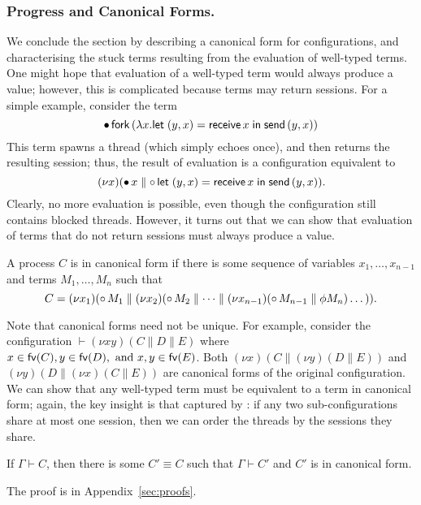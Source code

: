 \documentclass[oribibl,orivec,envcountsame]{llncs}
\begin{document}
\subsubsection{Progress and Canonical Forms.}

We conclude the section by describing a canonical form for configurations, and characterising the
stuck terms resulting from the evaluation of well-typed terms.  One might hope that evaluation of a
well-typed term would always produce a value; however, this is complicated because terms may return
sessions.  For a simple example, consider the term
%
\[
  {\mathord{\bullet}}\,\mathsf{fork} \, (\lambda x. \mathsf{let}\;(y,x) = \mathsf{receive} \, x\;\mathsf{in}\;\mathsf{send} \, (y,x))
\]
%
This term spawns a thread (which simply echoes once), and then returns the resulting session; thus,
the result of evaluation is a configuration equivalent to
\[
  (\nu x)({\mathord{\bullet}}\,x \parallel {\mathord{\circ}}\,\mathsf{let}\;(y,x) = \mathsf{receive} \, x\;\mathsf{in}\;\mathsf{send} \, (y,x)).
\]
Clearly, no more evaluation is possible, even though the configuration still contains blocked
threads.
%
However, it turns out that we can show that evaluation of terms that do not return sessions must
always produce a value.

\begin{definition}
A process $C$ is in canonical form if there is some sequence of variables $x_1,\dots,x_{n-1}$ and
terms $M_1,\dots,M_n$ such that
\[
  C = (\nu x_1)({\mathord{\circ}}\,M_1 \parallel (\nu x_2)({\mathord{\circ}}\,M_2 \parallel \dots \parallel (\nu x_{n-1})({\mathord{\circ}}\,M_{n-1} \parallel \phi M_n)\dots)).
\]
\end{definition}

Note that canonical forms need not be unique.  For example, consider the configuration $\vdash (\nu
xy)(C \parallel D \parallel E)$ where $x \in \mathsf{fv}(C), y \in \mathsf{fv}(D), \text{ and } x,y \in \mathsf{fv}(E)$.
Both $(\nu x)(C \parallel (\nu y)(D \parallel E))$ and $(\nu y)(D \parallel (\nu x)(C \parallel E))$
are canonical forms of the original configuration.  We can show that any well-typed term must be
equivalent to a term in canonical form; again, the key insight is that captured by
: if any two sub-configurations share at most one session, then we
can order the threads by the sessions they share.

\begin{lemma}\label{lem:canonical}
  If $\Gamma \vdash C$, then there is some $C' \equiv C$ such that $\Gamma \vdash C'$ and $C'$ is in
  canonical form.
\end{lemma}
The proof is in Appendix~\ref{sec:proofs}.
\end{document}

